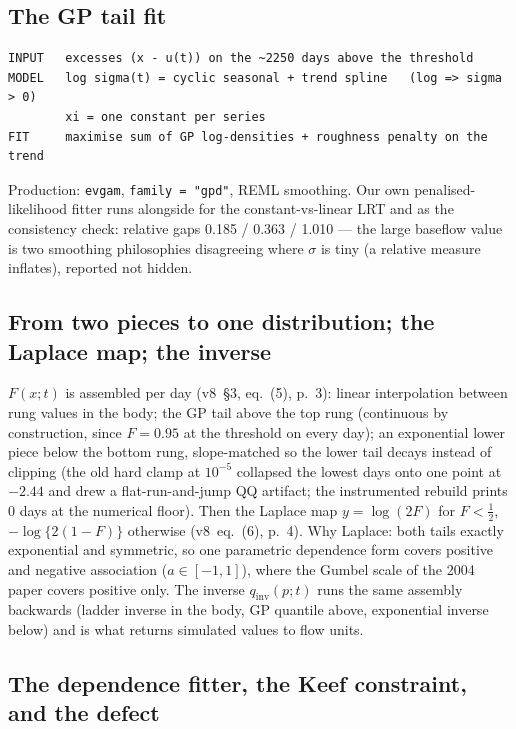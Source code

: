 \documentclass[11pt]{article}
\newcommand{\code}[1]{\texttt{#1}}
\begin{document}
\subsection{The GP tail fit}

\begin{Verbatim}[fontsize=\small]
INPUT   excesses (x - u(t)) on the ~2250 days above the threshold
MODEL   log sigma(t) = cyclic seasonal + trend spline   (log => sigma > 0)
        xi = one constant per series
FIT     maximise sum of GP log-densities + roughness penalty on the trend
\end{Verbatim}
Production: \code{evgam}, \code{family = "gpd"}, REML smoothing. Our own
penalised-likelihood fitter runs alongside for the constant-vs-linear LRT and
as the consistency check: relative gaps 0.185 / 0.363 / 1.010 --- the large
baseflow value is two smoothing philosophies disagreeing where $\sigma$ is
tiny (a relative measure inflates), reported not hidden.

\subsection{From two pieces to one distribution; the Laplace map; the inverse}

$F(x;t)$ is assembled per day (v8~\S3, eq.~(5), p.~3): linear interpolation
between rung values in the body; the GP tail above the top rung (continuous
by construction, since $F = 0.95$ at the threshold on every day); an
exponential lower piece below the bottom rung, slope-matched so the lower
tail decays instead of clipping (the old hard clamp at $10^{-5}$ collapsed
the lowest days onto one point at $-2.44$ and drew a flat-run-and-jump QQ
artifact; the instrumented rebuild prints 0 days at the numerical floor).
Then the Laplace map $y = \log(2F)$ for $F < \tfrac12$,
$-\log\{2(1-F)\}$ otherwise (v8~eq.~(6), p.~4). Why Laplace: both tails
exactly exponential and symmetric, so one parametric dependence form covers
positive and negative association ($a \in [-1,1]$), where the Gumbel scale
of the 2004 paper covers positive only. The inverse $q_{\mathrm{inv}}(p;t)$
runs the same assembly backwards (ladder inverse in the body, GP quantile
above, exponential inverse below) and is what returns simulated values to
flow units.

\subsection{The dependence fitter, the Keef constraint, and the defect}
\label{sec:defect}
\end{document}
